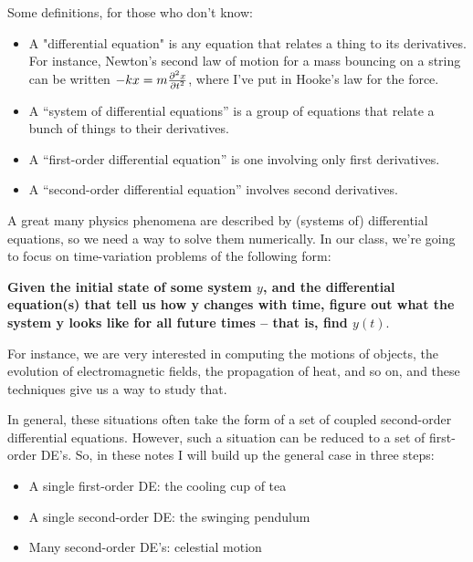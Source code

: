 \documentclass[12ampt]{article}
\def\PARTWO#1#2{ {{\partial^2 #1}\over{\partial #2}^2} }
\begin{document}
\Large
\centerline{}
\normalsize

Some definitions, for those who don't know:

\begin{itemize}
\item A "differential equation" is any equation that relates a thing to its 
derivatives. For instance, Newton's second law of motion for a mass bouncing
on a string can be written
$-kx = m \PARTWO{x}{t}$, where I've put in Hooke's law for the force.

\item A ``system of differential equations'' is a group of equations 
that relate a bunch of things to their derivatives.

\item A ``first-order differential equation'' is one involving only first derivatives.

\item A ``second-order differential equation'' involves second derivatives.

\end{itemize}

A great many physics phenomena are described by (systems of) differential equations, so we need a way to solve them numerically. In our class, we're going to focus on time-variation problems of the following form:

{\bf Given the initial state of some system $y$, and the differential equation(s) that tell us how y changes with time, figure out what the system y looks like for all future times -- that is, find $y(t)$}.

For instance, we are very interested in computing the motions of objects, 
the evolution of electromagnetic fields, 
the propagation of heat, and so on, 
and these techniques give us a way to study that.

In general, these situations often take the form of a set of coupled second-order differential equations. 
However, such a situation can be reduced to a set of 
first-order DE's. So, in these notes I will build up the general case in three steps:

\begin{itemize}
  \item{A single first-order DE: the cooling cup of tea}
  \item{A single second-order DE: the swinging pendulum} 
  \item{Many second-order DE's: celestial motion}
\end{itemize}
\end{document}
